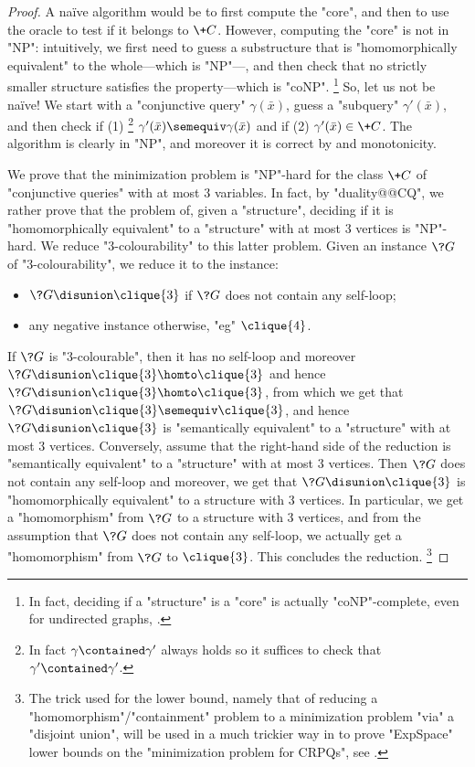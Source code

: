\begin{proof}
	A naïve algorithm would be to first compute the "core", and then to use the oracle
	to test if it belongs to $\+C$.
	However, computing the "core" is not in "NP": intuitively,
	we first need to guess a substructure that is "homomorphically equivalent"
	to the whole---which is "NP"---,
	and then check that no strictly smaller structure satisfies the property---which is "coNP".%
	\footnote{In fact, deciding if a "structure" is a "core" is actually
	"coNP"-complete, even for undirected graphs, \cite[Theorem~7]{HellNesetril1992Core}.}
	So, let us not be naïve! We start with a "conjunctive query"
	$\gamma(\bar x)$, guess a "subquery" $\gamma'(\bar x)$,
	and then check if (1)%
	\footnote{In fact $\gamma \contained \gamma'$ always holds so
	it suffices to check that $\gamma' \contained \gamma'$.}
	$\gamma'(\bar x) \semequiv \gamma(\bar x)$ and
	if (2) $\gamma'(\bar x) \in \+C$.
	The algorithm is clearly in "NP", and moreover it is correct
	by  and monotonicity.

	 We prove that the minimization problem
	is "NP"-hard for the class $\+C$ of "conjunctive queries" with
	at most $3$ variables.
	In fact, by "duality@@CQ", we rather prove that the problem
	of, given a "structure", deciding if it is "homomorphically equivalent"
	to a "structure" with at most $3$ vertices is "NP"-hard.
	We reduce "$3$-colourability" to this latter problem.
	Given an instance $\?G$ of "$3$-colourability", we reduce
	it to the instance:
	\begin{itemize}
		\item $\?G \disunion \clique{3}$ if $\?G$ does not contain any self-loop;
		\item any negative instance otherwise, "eg" $\clique{4}$.
	\end{itemize}
	If $\?G$ is "$3$-colourable", then it has no self-loop
	and moreover $\?G \disunion \clique{3} \homto \clique{3}$
	and hence $\?G \disunion \clique{3} \homto \clique{3}$, 
	from which we get that $\?G \disunion \clique{3} \semequiv \clique{3}$,
	and hence $\?G \disunion \clique{3}$ is "semantically equivalent" to a "structure"
	with at most $3$ vertices.
	Conversely, assume that the right-hand side of the reduction is "semantically equivalent" to a 
	"structure" with at most $3$ vertices. Then $\?G$ does not contain any self-loop
	and moreover, we get that $\?G \disunion \clique{3}$ is "homomorphically equivalent"
	to a structure with 3 vertices.
	In particular, we get a "homomorphism" from $\?G$ to a structure with 3 vertices,
	and from the assumption that $\?G$ does not contain any self-loop,
	we actually get a "homomorphism" from $\?G$ to $\clique{3}$.
	This concludes the reduction.%
	\footnote[][-3cm]{The trick used for the lower bound, 
	namely that of reducing a "homomorphism"/"containment" problem
	to a minimization problem "via" a "disjoint union", will be used in a
	much trickier way in 
	to prove "ExpSpace" lower bounds on the "minimization problem for CRPQs", 
	see .}
\end{proof}

